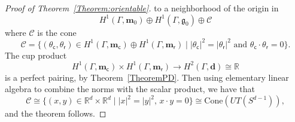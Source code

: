\documentclass[a4paper,11pt]{article}
\begin{document}
\begin{proof}[Proof of Theorem~\ref{Theorem:orientable}]
to a neighborhood of the origin in 
$$
H^1(\Gamma, \mathbf{m}_0)\oplus H^1(\Gamma, \mathfrak{g}_0)\oplus {\mathcal C}
$$
where ${\mathcal C}$ is the cone
$$
{\mathcal C}=
 \{(\theta_{\mathsf c},\theta_{\mathsf r})\in 
 H^1(\Gamma, \mathbf m_{\mathsf c})\oplus H^1(\Gamma, \mathbf m_{\mathsf r}) \mid |\theta_{\mathsf c}|^2= |\theta_{\mathsf r}|^2\textrm{ and }
 \theta_{\mathsf c}\cdot \theta_{\mathsf r}=0\}. 
$$
The cup product
$$
H^1(\Gamma, \mathbf m_{\mathsf c})\times H^1(\Gamma, \mathbf m_{\mathsf r})\to 
H^2(\Gamma, \mathbf d)\cong\mathbb R
$$
is a perfect pairing, by Theorem~\ref{TheoremPD}. Then using elementary linear algebra to combine 
the norms with the scalar product, we have that
$$
{\mathcal C}\cong\{(x,y)\in\mathbb R^d\times \mathbb R^d\mid |x|^2=|y|^2,\, x\cdot y=0\}\cong \mathrm{Cone}(UT(S^{d-1})),
$$
and the theorem follows.
\end{proof}
\end{document}

